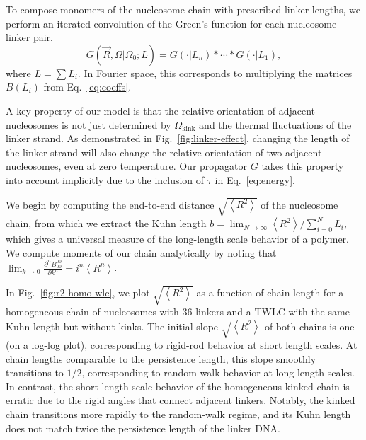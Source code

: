 \documentclass[%
 reprint,
superscriptaddress,
showpacs,preprintnumbers,
 amsmath,amssymb,
 aps,
 prl,
]{revtex4-1}
\newcommand{\greens}[2][\Omega_0; L]{G(#2|#1)}
\newcommand{\RR}{\left\langle{}R^2\right\rangle{}}
\begin{document}
To compose monomers of the nucleosome chain with prescribed linker lengths, we
    perform an iterated convolution of the Green's function for each
    nucleosome-linker pair.
    \begin{equation}\label{eq:conv}
        \greens{\vec{R},\Omega} = \greens[L_n]{\cdot} * \cdots{} * \greens[L_1]{\cdot},
    \end{equation}%
    where $L = \sum L_i$.
In Fourier space, this corresponds to multiplying the matrices $B(L_i)$
    from Eq.~\ref{eq:coeffs}.

A key property of our model is that the relative orientation of adjacent
    nucleosomes is not just determined by $\Omega_\text{kink}$ and the thermal
    fluctuations of the linker strand.
As demonstrated in Fig.~\ref{fig:linker-effect}, changing the length of the
    linker strand will also change the relative orientation of two adjacent
    nucleosomes, even at zero temperature.
Our propagator $G$ takes this property into account implicitly due to the inclusion of $\tau$
    in Eq.~\ref{eq:energy}.



We begin by computing the end-to-end distance $\sqrt{\RR}$ of the nucleosome
    chain, from which we extract the Kuhn length $b = \lim_{N\to\infty} \RR/\sum_{i=0}^N L_i$,
    which gives a universal measure of the long-length scale behavior of a polymer.
We compute moments of our chain analytically by noting that
    $\lim_{k\to0} \frac{\partial^{n} B_{00}^{00}}{\partial k^{n}} = i^n \left\langle
    R^n\right\rangle$.

In Fig.~\ref{fig:r2-homo-wlc}, we plot $\sqrt{\RR}$ as a function of chain
    length for a homogeneous chain of nucleosomes with \SI{36}{\basepair}
    linkers and a TWLC with the same Kuhn length but without kinks.
The initial slope $\sqrt{\RR}$ of both chains is one (on a log-log plot),
    corresponding to rigid-rod behavior at short length scales.
At chain lengths comparable to the persistence length, this slope smoothly
    transitions to $1/2$, corresponding to random-walk behavior at long length
    scales.
In contrast, the short length-scale behavior of the homogeneous kinked chain is
    erratic due to the rigid angles that connect adjacent linkers.
Notably, the kinked chain transitions more rapidly to the random-walk regime,
    and its Kuhn length does not match twice the persistence length of the
    linker DNA\@.
\end{document}
